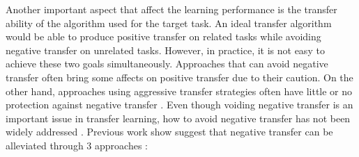 Another important aspect that affect the learning performance is the transfer ability of the algorithm used for the target task. An ideal transfer algorithm would be able to produce positive transfer on related tasks while avoiding negative transfer on unrelated tasks. However, in practice, it is not easy to achieve these two goals simultaneously. Approaches that can avoid negative transfer often bring some affects on positive transfer due to their caution. On the other hand, approaches using aggressive transfer strategies often have little or no protection against negative transfer \cite{torrey2009transfer}. Even though voiding negative transfer is an important issue in transfer learning, how to avoid negative transfer has not been widely addressed \cite{lu2015transfer} \cite{pan2010survey}. Previous work show suggest that negative transfer can be alleviated through 3 approaches \cite{torrey2009transfer}: 
